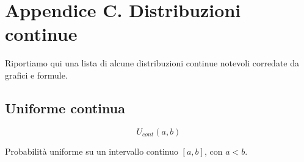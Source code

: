 \clearpage

\section*{Appendice C. Distribuzioni continue} \label{appendice-continue} %
\addtocounter{section}{1}
\setcounter{subsection}{0}
\setcounter{teo}{0}

Riportiamo qui una lista di alcune distribuzioni continue notevoli corredate da grafici e formule.

\subsection{Uniforme continua}

	$$ U_{cont}(a,b) $$

	Probabilità uniforme su un intervallo continuo $[a,b]$, con $a < b$.

